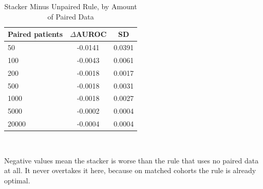 \begin{table}[!htbp]
\caption{Stacker Minus Unpaired Rule, by Amount of Paired Data}
\label{tab:spaired}
\centering\footnotesize
\begin{tabular}{@{}lcc@{}}
\toprule
Paired patients & $\Delta$AUROC & SD \\
\midrule
50 & -0.0141 & 0.0391 \\
100 & -0.0043 & 0.0061 \\
200 & -0.0018 & 0.0017 \\
500 & -0.0018 & 0.0031 \\
1000 & -0.0018 & 0.0027 \\
5000 & -0.0002 & 0.0004 \\
20000 & -0.0004 & 0.0004 \\
\bottomrule
\end{tabular}
\\[2pt]\begin{minipage}{\textwidth}\scriptsize Negative values mean the stacker is worse than the rule that uses no paired data at all. It never overtakes it here, because on matched cohorts the rule is already optimal.\end{minipage}
\end{table}
